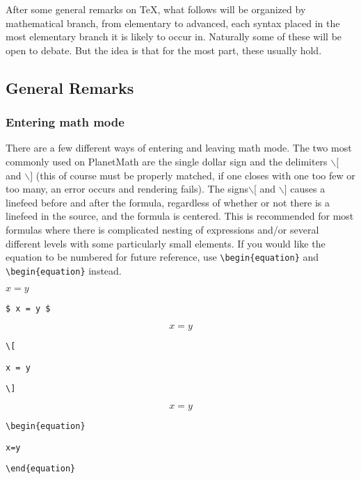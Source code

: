 After some general remarks on \TeX{}, what follows will be organized by mathematical branch, from elementary to advanced, each syntax placed in the most elementary branch it is likely to occur in. Naturally some of these will be open to debate. But the idea is that for the most part, these usually hold.

\subsection{General Remarks}

\subsubsection{Entering math mode}

There are a few different ways of entering and leaving math mode. The two most commonly used on PlanetMath are the single dollar sign and the delimiters $\backslash [$ and $\backslash ]$ (this of course must be properly matched, if one closes with one too few or too many, an error occurs and rendering fails). The signs$\backslash [$ and $\backslash ]$ causes a linefeed before and after the formula, regardless of whether or not there is a linefeed in the source, and the formula is centered. This is recommended for most formulas where there is complicated nesting of expressions and/or several different levels with some particularly small elements.  If you would like the equation to be numbered for future reference, use \texttt{\textbackslash begin\{equation\}} and \texttt{\textbackslash begin\{equation\}} instead.

\medskip

$ x = y $

\smallskip

\verb"$ x = y $"

\bigskip

\[
x = y
\]

\medskip

\verb"\["

\verb"x = y"

\verb"\]"

\bigskip

\begin{equation}
x=y
\end{equation}

\verb"\begin{equation}"

\verb"x=y"

\verb"\end{equation}"

